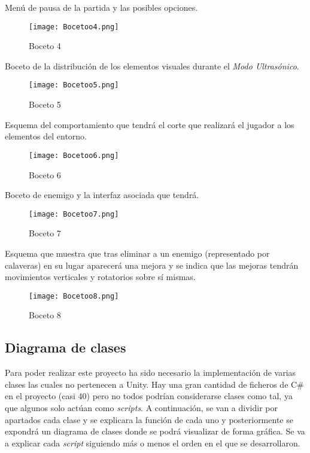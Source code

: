 Menú de pausa de la partida y las posibles opciones.

\begin{figure}[H]
    \centering
    \texttt{[image: Bocetoo4.png]}
    \caption{Boceto 4}
\end{figure}

Boceto de la distribución de los elementos visuales durante el \textit{Modo Ultrasónico}.

\begin{figure}[H]
    \centering
    \texttt{[image: Bocetoo5.png]}
    \caption{Boceto 5}
\end{figure}

Esquema del comportamiento que tendrá el corte que realizará el jugador a los elementos del entorno.

\begin{figure}[H]
    \centering
    \texttt{[image: Bocetoo6.png]}
    \caption{Boceto 6}
\end{figure}

Boceto de enemigo y la interfaz asociada que tendrá.

\begin{figure}[H]
    \centering
    \texttt{[image: Bocetoo7.png]}
    \caption{Boceto 7}
\end{figure}

Esquema que muestra que tras eliminar a un enemigo (representado por calaveras) en su lugar aparecerá una mejora y se indica que las mejoras tendrán movimientos verticales y rotatorios sobre sí mismas.

\begin{figure}[H]
    \centering
    \texttt{[image: Bocetoo8.png]}
    \caption{Boceto 8}
\end{figure}

\subsection{Diagrama de clases}

Para poder realizar este proyecto ha sido necesario la implementación de varias clases las cuales no pertenecen a Unity. Hay una gran cantidad de ficheros de C\# en el proyecto (casi 40) pero no todos podrían considerarse clases como tal, ya que algunos solo actúan como \textit{scripts}. A continuación, se van a dividir por apartados cada clase y se explicara la función de cada uno y posteriormente se expondrá un diagrama de clases donde se podrá visualizar de forma gráfica. Se va a explicar cada \textit{script} siguiendo más o menos el orden en el que se desarrollaron.

